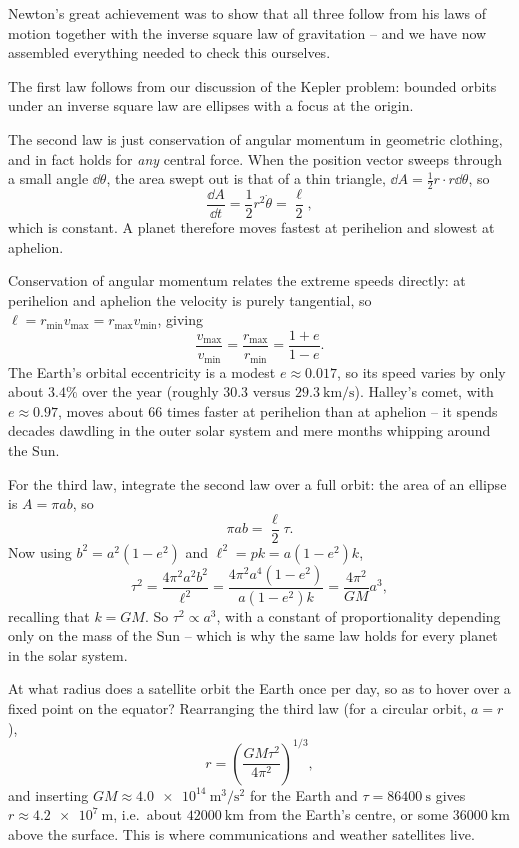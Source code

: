 \documentclass[a4paper]{scrartcl}
\begin{document}
Newton's great achievement was to show that all three follow from his laws of motion together with the inverse square law of gravitation -- and we have now assembled everything needed to check this ourselves.

The first law follows from our discussion of the Kepler problem: bounded orbits under an inverse square law are ellipses with a focus at the origin.

The second law is just conservation of angular momentum in geometric clothing, and in fact holds for \emph{any} central force. When the position vector sweeps through a small angle $\dd\theta$, the area swept out is that of a thin triangle, $\dd A = \frac{1}{2}r \cdot r \dd\theta$, so
$$
\frac{\dd A}{\dd t} = \frac{1}{2}r^2 \dot{\theta} = \frac{\ell}{2},
$$
which is constant. A planet therefore moves fastest at perihelion and slowest at aphelion.

\begin{example}
	Conservation of angular momentum relates the extreme speeds directly: at perihelion and aphelion the velocity is purely tangential, so $\ell = r_{\min}v_{\max} = r_{\max}v_{\min}$, giving
	$$
	\frac{v_{\max}}{v_{\min}} = \frac{r_{\max}}{r_{\min}} = \frac{1 + e}{1 - e}.
	$$
	The Earth's orbital eccentricity is a modest $e \approx 0.017$, so its speed varies by only about $3.4\%$ over the year (roughly $30.3$ versus $\SI{29.3}{\kilo\meter\per\second}$). Halley's comet, with $e \approx 0.97$, moves about $66$ times faster at perihelion than at aphelion -- it spends decades dawdling in the outer solar system and mere months whipping around the Sun.
\end{example}

For the third law, integrate the second law over a full orbit: the area of an ellipse is $A = \pi a b$, so
$$
\pi a b = \frac{\ell}{2} \tau.
$$
Now using $b^2 = a^2 (1 - e^2)$ and $\ell^2 = pk = a(1 - e^2)k$,
$$
\tau^2 = \frac{4 \pi^2 a^2 b^2}{\ell^2} = \frac{4\pi^2 a^4 (1 - e^2)}{a(1-e^2)k} = \frac{4 \pi^2}{GM} a^3,
$$
recalling that $k = GM$. So $\tau^2 \propto a^3$, with a constant of proportionality depending only on the mass of the Sun -- which is why the same law holds for every planet in the solar system.

\begin{example}
	At what radius does a satellite orbit the Earth once per day, so as to hover over a fixed point on the equator? Rearranging the third law (for a circular orbit, $a = r$),
	$$
	r = \left(\frac{GM \tau^2}{4\pi^2}\right)^{1/3},
	$$
	and inserting $GM \approx \SI{4.0e14}{\meter\cubed\per\second\squared}$ for the Earth and $\tau = \SI{86400}{\second}$ gives $r \approx \SI{4.2e7}{\meter}$, i.e.\ about $\SI{42000}{\kilo\meter}$ from the Earth's centre, or some $\SI{36000}{\kilo\meter}$ above the surface. This is where communications and weather satellites live.
\end{example}
\end{document}
